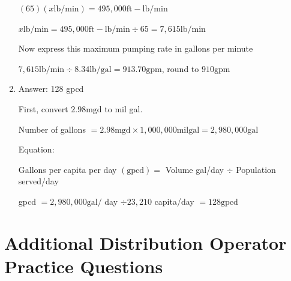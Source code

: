 \documentclass[10pt]{article}
\begin{document}
\begin{enumerate}
$(65)(x \mathrm{lb} / \mathrm{min})=495,000 \mathrm{ft}-\mathrm{lb} / \mathrm{min}$

$x \mathrm{lb} / \mathrm{min}=495,000 \mathrm{ft}-\mathrm{lb} / \mathrm{min} \div 65=7,615 \mathrm{lb} / \mathrm{min}$

Now express this maximum pumping rate in gallons per minute

$7,615 \mathrm{lb} / \mathrm{min} \div 8.34 \mathrm{lb} / \mathrm{gal}=913.70 \mathrm{gpm}$, round to $910 \mathrm{gpm}$

  \item Answer: 128 gpcd

First, convert $2.98 \mathrm{mgd}$ to mil gal.

Number of gallons $=2.98 \mathrm{mgd} \times 1,000,000 \mathrm{mil} \mathrm{gal}=2,980,000 \mathrm{gal}$

Equation:

Gallons per capita per day $(\mathrm{gpcd})=$ Volume gal/day $\div$ Population served/day

gpcd $=2,980,000 \mathrm{gal} /$ day $\div 23,210$ capita/day $=128 \mathrm{gpcd}$
  
  
\end{enumerate}


\section{Additional Distribution Operator Practice Questions}
\end{document}
